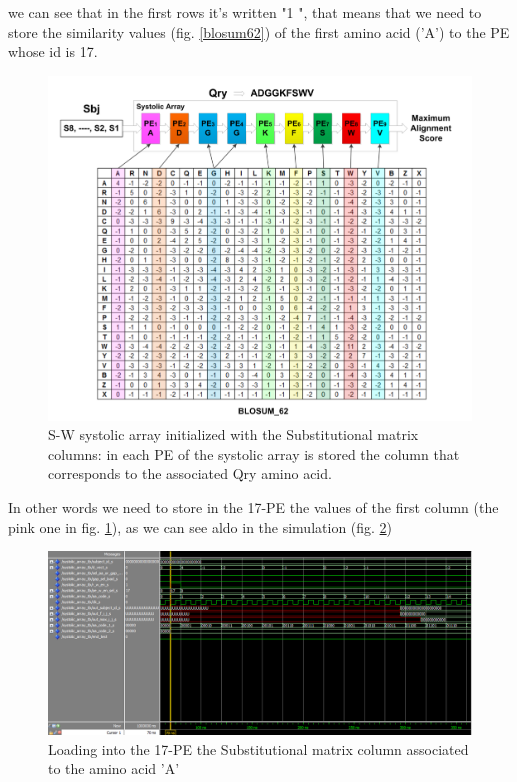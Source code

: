 we can see that in the first rows it's written "1 ", that means that we need to store the similarity values (fig. \ref{blosum62}) of the first amino acid ('A') to the PE whose id is 17.
\begin{figure}[h!]
	\centering
	\includegraphics[width=\textwidth]{imm/sw/tb_sw1.png} 	\caption{S-W systolic array initialized with the Substitutional matrix columns: in each PE of the systolic array is stored the column that corresponds to the associated Qry amino acid.} 
	\label{tb_sw1}
\end{figure}

In other words we need to store in the 17-PE the values of the first column (the pink one in fig. \ref{tb_sw1}), as we can see aldo in the simulation (fig. \ref{tb_load_17})
\begin{figure}[h!]
	\centering
	\includegraphics[width=\textwidth]{imm/sw/load_pe17_AA1.png}
	 	\caption{Loading into the 17-PE the Substitutional matrix column associated to the amino acid 'A'} 
	\label{tb_load_17}
\end{figure}

